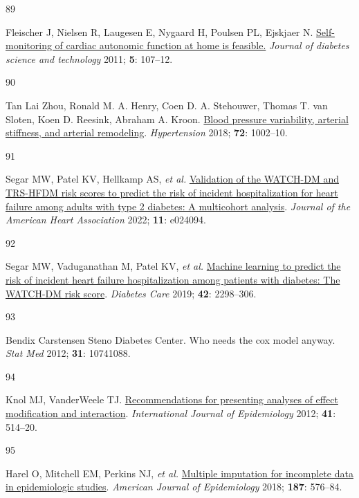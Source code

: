 \documentclass[
  letterpaper,
  headsepline=true,
  open=any]{scrbook}
\newlength{\cslhangindent}
\newlength{\csllabelwidth}
\newlength{\cslentryspacingunit} %
\newenvironment{CSLReferences}[2] %
 {%
  \setlength{\parindent}{0pt}
  \ifodd #1
  \let\oldpar\par
  \def\par{\hangindent=\cslhangindent\oldpar}
  \fi
  \setlength{\parskip}{#2\cslentryspacingunit}
 }%
 {}
\newcommand{\CSLLeftMargin}[1]{\parbox[t]{\csllabelwidth}{#1}}
\newcommand{\CSLRightInline}[1]{\parbox[t]{\linewidth - \csllabelwidth}{#1}\break}
\begin{document}
\begin{CSLReferences}{0}{0}
\leavevmode{}%
\CSLLeftMargin{89 }%
\CSLRightInline{Fleischer J, Nielsen R, Laugesen E, Nygaard H, Poulsen
PL, Ejskjaer N.
\href{https://doi.org/10.1177/193229681100500115}{Self-monitoring of
cardiac autonomic function at home is feasible.} \emph{Journal of
diabetes science and technology} 2011; \textbf{5}: 107--12.}

\leavevmode{}%
\CSLLeftMargin{90 }%
\CSLRightInline{Tan Lai Zhou, Ronald M. A. Henry, Coen D. A. Stehouwer,
Thomas T. van Sloten, Koen D. Reesink, Abraham A. Kroon.
\href{https://doi.org/doi:10.1161/HYPERTENSIONAHA.118.11325}{Blood
pressure variability, arterial stiffness, and arterial remodeling}.
\emph{Hypertension} 2018; \textbf{72}: 1002--10.}

\leavevmode{}%
\CSLLeftMargin{91 }%
\CSLRightInline{Segar MW, Patel KV, Hellkamp AS, \emph{et al.}
\href{https://doi.org/10.1161/JAHA.121.024094}{Validation of the
WATCH{-}DM and TRS{-}HFDM risk scores to predict the risk of incident
hospitalization for heart failure among adults with type 2 diabetes: A
multicohort analysis}. \emph{Journal of the American Heart Association}
2022; \textbf{11}: e024094.}

\leavevmode{}%
\CSLLeftMargin{92 }%
\CSLRightInline{Segar MW, Vaduganathan M, Patel KV, \emph{et al.}
\href{https://doi.org/10.2337/dc19-0587}{Machine learning to predict the
risk of incident heart failure hospitalization among patients with
diabetes: The WATCH-DM risk score}. \emph{Diabetes Care} 2019;
\textbf{42}: 2298--306.}

\leavevmode{}%
\CSLLeftMargin{93 }%
\CSLRightInline{Bendix Carstensen Steno Diabetes Center. Who needs the
cox model anyway. \emph{Stat Med} 2012; \textbf{31}: 10741088.}

\leavevmode{}%
\CSLLeftMargin{94 }%
\CSLRightInline{Knol MJ, VanderWeele TJ.
\href{https://doi.org/10.1093/ije/dyr218}{Recommendations for presenting
analyses of effect modification and interaction}. \emph{International
Journal of Epidemiology} 2012; \textbf{41}: 514--20.}

\leavevmode{}%
\CSLLeftMargin{95 }%
\CSLRightInline{Harel O, Mitchell EM, Perkins NJ, \emph{et al.}
\href{https://doi.org/10.1093/aje/kwx349}{Multiple imputation for
incomplete data in epidemiologic studies}. \emph{American Journal of
Epidemiology} 2018; \textbf{187}: 576--84.}


\end{CSLReferences}
\end{document}
